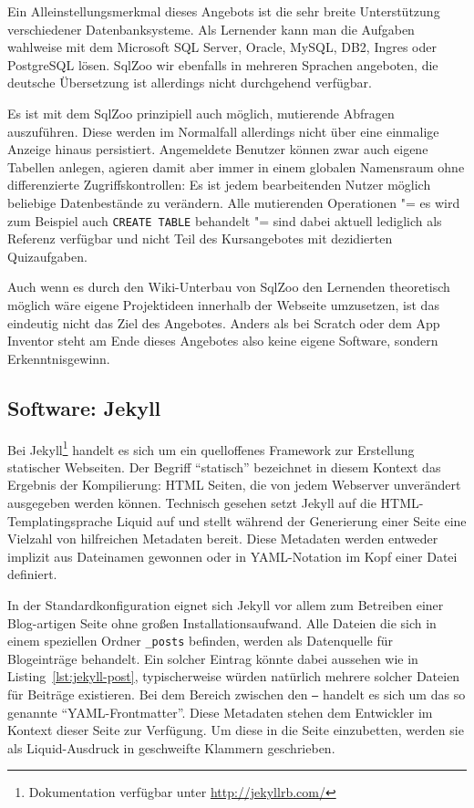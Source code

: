 Ein Alleinstellungsmerkmal dieses Angebots ist die sehr breite Unterstützung verschiedener Datenbanksysteme. Als Lernender kann man die Aufgaben wahlweise mit dem Microsoft SQL Server, Oracle, MySQL, DB2, Ingres oder PostgreSQL lösen. SqlZoo wir ebenfalls in mehreren Sprachen angeboten, die deutsche Übersetzung ist allerdings nicht durchgehend verfügbar.

Es ist mit dem SqlZoo prinzipiell auch möglich, mutierende Abfragen auszuführen. Diese werden im Normalfall allerdings nicht über eine einmalige Anzeige hinaus persistiert. Angemeldete Benutzer können zwar auch eigene Tabellen anlegen, agieren damit aber immer in einem globalen Namensraum ohne differenzierte Zugriffskontrollen: Es ist jedem bearbeitenden Nutzer möglich beliebige Datenbestände zu verändern. Alle mutierenden Operationen "= es wird zum Beispiel auch \lstinline{CREATE TABLE} behandelt "= sind dabei aktuell lediglich als Referenz verfügbar und nicht Teil des Kursangebotes mit dezidierten Quizaufgaben.

Auch wenn es durch den Wiki-Unterbau von SqlZoo den Lernenden theoretisch möglich wäre eigene Projektideen innerhalb der Webseite umzusetzen, ist das eindeutig nicht das Ziel des Angebotes. Anders als bei Scratch oder dem App Inventor steht am Ende dieses Angebotes also keine eigene Software, sondern Erkenntnisgewinn.

\subsection{Software: Jekyll}
\label{sec:software-jekyll}
Bei Jekyll\footnote{Dokumentation verfügbar unter \url{http://jekyllrb.com/}} handelt es sich um ein quelloffenes Framework zur Erstellung statischer Webseiten. Der Begriff "`statisch"' bezeichnet in diesem Kontext das Ergebnis der Kompilierung: HTML Seiten, die von jedem Webserver unverändert ausgegeben werden können. Technisch gesehen setzt Jekyll auf die HTML-Templatingsprache Liquid auf und stellt während der Generierung einer Seite eine Vielzahl von hilfreichen Metadaten bereit. Diese Metadaten werden entweder implizit aus Dateinamen gewonnen oder in YAML-Notation im Kopf einer Datei definiert.

In der Standardkonfiguration eignet sich Jekyll vor allem zum Betreiben einer Blog-artigen Seite ohne großen Installationsaufwand. Alle Dateien die sich in einem speziellen Ordner \texttt{\_posts} befinden, werden als Datenquelle für Blogeinträge behandelt. Ein solcher Eintrag könnte dabei aussehen wie in Listing~\ref{lst:jekyll-post}, typischerweise würden natürlich mehrere solcher Dateien für Beiträge existieren. Bei dem Bereich zwischen den \texttt{---} handelt es sich um das so genannte "`YAML-Frontmatter"'. Diese Metadaten stehen dem Entwickler im Kontext dieser Seite zur Verfügung. Um diese in die Seite einzubetten, werden sie als Liquid-Ausdruck in geschweifte Klammern geschrieben.


